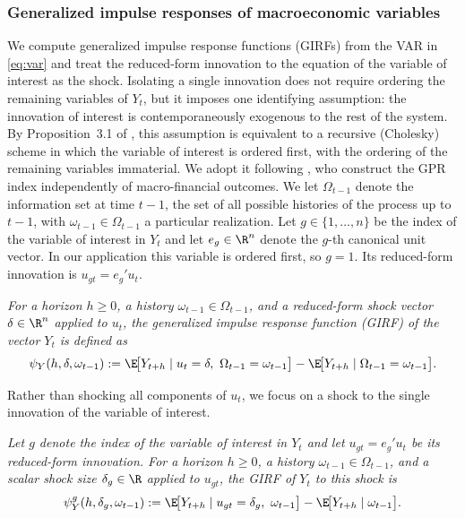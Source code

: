 \subsubsection{Generalized impulse responses of macroeconomic variables}
We compute generalized impulse response functions (GIRFs) from the VAR in
\eqref{eq:var} and treat the reduced-form innovation to the equation of the
variable of interest as the shock. Isolating a single innovation does not require
ordering the remaining variables of $Y_t$, but it imposes one identifying
assumption: the innovation of interest is contemporaneously exogenous to the rest
of the system. By Proposition~3.1 of \citet{pesaranShin1998}, this assumption is
equivalent to a recursive (Cholesky) scheme in which the variable of interest is
ordered first, with the ordering of the remaining variables immaterial. We adopt
it following \citet{caldara2022geopolitical}, who construct the GPR index
independently of macro-financial outcomes.
We let $\Omega_{t-1}$ denote the information set at time $t-1$, the set of all
possible histories of the process up to $t-1$, with $\omega_{t-1} \in
\Omega_{t-1}$ a particular realization. Let $g \in \{1,\dots,n\}$ be the index of
the variable of interest in $Y_t$ and let $e_g \in \R^n$ denote the $g$-th
canonical unit vector. In our application this variable is ordered first, so
$g=1$. Its reduced-form innovation is $u_{gt} = e_g' u_t$.
\begin{defn}\label{prop:GIRF}
    \textit{For a horizon $h \ge 0$, a history $\omega_{t-1} \in \Omega_{t-1}$,
    and a reduced-form shock vector $\delta \in \R^{n}$ applied to $u_t$,
    the generalized impulse response function (GIRF) of the vector $Y_t$
    is defined as}
    \begin{equation}
         \psi_Y(h,\delta,\omega_{t-1})
        := \E\!\big[Y_{t+h}\mid u_t=\delta,\ \Omega_{t-1} = \omega_{t-1}\big]
        - \E\!\big[Y_{t+h}\mid \Omega_{t-1} =\omega_{t-1}\big].
    \label{eq:GIRF-def}
    \end{equation}
\end{defn}
Rather than shocking all components of $u_t$, we focus on a shock to the single
innovation of the variable of interest.
\begin{defn}\label{prop:GIRF-GPR}
    \textit{Let $g$ denote the index of the variable of interest in $Y_t$ and let
    $u_{gt} = e_g' u_t$ be its reduced-form innovation. For a horizon
    $h \ge 0$, a history $\omega_{t-1} \in \Omega_{t-1}$, and a scalar shock
    size $\delta_g \in \R$ applied to $u_{gt}$, the GIRF of $Y_t$ to this shock
    is}
    \begin{equation}
        \psi_Y^g(h,\delta_g,\omega_{t-1})
        := \E\!\big[Y_{t+h}\mid u_{gt}=\delta_g,\ \omega_{t-1}\big]
        - \E\!\big[Y_{t+h}\mid \omega_{t-1}\big].
    \label{eq:GIRF-def-GPR}
    \end{equation}
\end{defn}
